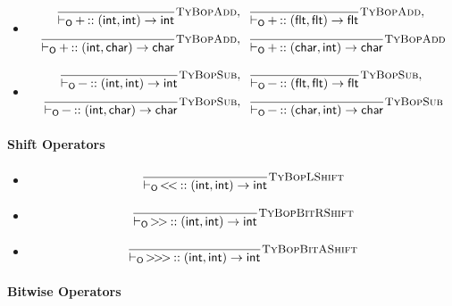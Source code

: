\documentclass{article}
\newcommand{\code}[1]{\lstinline[columns=fixed]{#1}}
\newcommand{\drmrule}[5]{\frac{#1}{#2\vdash_{\mathsf{#3}}#4}\textsc{\small{#5}}}
\newcommand{\subsubsubsection}{\paragraph}
\begin{document}
					\begin{itemize}
						\item
							\begin{align*}
								\drmrule{}{}{O}{\textnormal{\code{+}} :: \mathsf{(int,int) \to int}}{TyBopAdd},\ \ &
								\drmrule{}{}{O}{\textnormal{\code{+}} :: \mathsf{(flt,flt) \to flt}}{TyBopAdd},\\
								\drmrule{}{}{O}{\textnormal{\code{+}} :: \mathsf{(int,char) \to char}}{TyBopAdd},\ \ &
								\drmrule{}{}{O}{\textnormal{\code{+}} :: \mathsf{(char,int) \to char}}{TyBopAdd}
							\end{align*}
						\item
							\begin{align*}
								\drmrule{}{}{O}{\textnormal{\code{-}} :: \mathsf{(int,int) \to int}}{TyBopSub},\ \ &
								\drmrule{}{}{O}{\textnormal{\code{-}} :: \mathsf{(flt,flt) \to flt}}{TyBopSub},\\
								\drmrule{}{}{O}{\textnormal{\code{-}} :: \mathsf{(int,char) \to char}}{TyBopSub},\ \ &
								\drmrule{}{}{O}{\textnormal{\code{-}} :: \mathsf{(char,int) \to char}}{TyBopSub}
							\end{align*}
					\end{itemize}
				
				\subsubsubsection{Shift Operators}
				
					\begin{itemize}
						\item
							\begin{align*}
								\drmrule{}{}{O}{\textnormal{\code{<<}} :: \mathsf{(int,int) \to int}}{TyBopLShift}
							\end{align*}
						\item
							\begin{align*}
								\drmrule{}{}{O}{\textnormal{\code{>>}} :: \mathsf{(int,int) \to int}}{TyBopBitRShift}
							\end{align*}
						\item
							\begin{align*}
								\drmrule{}{}{O}{\textnormal{\code{>>>}} :: \mathsf{(int,int) \to int}}{TyBopBitAShift}
							\end{align*}
					\end{itemize}
				
				\subsubsubsection{Bitwise Operators}
				
\end{document}
